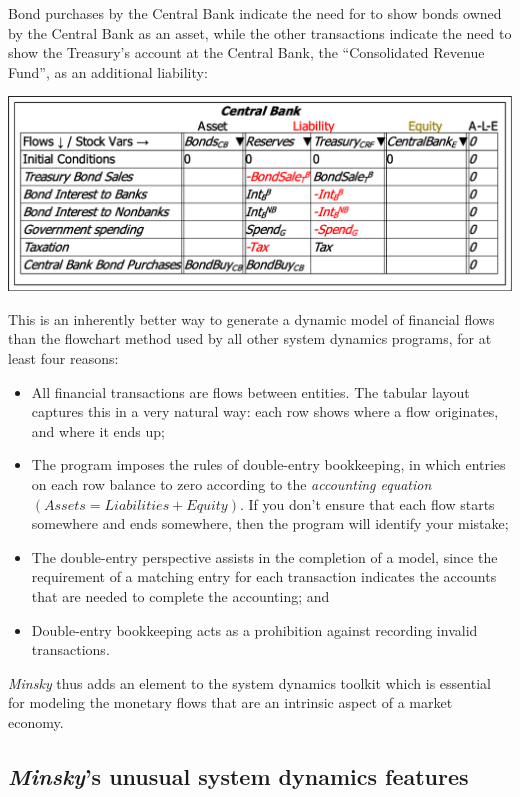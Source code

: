 Bond purchases by the Central Bank indicate the need for to show bonds
owned by the Central Bank as an asset, while the other transactions
indicate the need to show the Treasury's account at the Central Bank,
the ``Consolidated Revenue Fund'', as an additional liability:

\noindent\includegraphics[width=\textwidth]{images/GodleyTableSecondComplete}

This is an inherently better way to generate a dynamic model of financial
flows than the flowchart method used by all other system dynamics
programs, for at least four reasons: 
\begin{itemize}
\item All financial transactions are flows between entities. The tabular
layout captures this in a very natural way: each row shows where a
flow originates, and where it ends up;
\item The program imposes the rules of double-entry bookkeeping, in which
entries on each row balance to zero according to the {\em accounting
equation} $(Assets=Liabilities+Equity)$. If you don't ensure that
each flow starts somewhere and ends somewhere, then the program will
identify your mistake;
\item The double-entry perspective assists in the completion of a model,
since the requirement of a matching entry for each transaction indicates
the accounts that are needed to complete the accounting; and
\item Double-entry bookkeeping acts as a prohibition against recording invalid
transactions.
\end{itemize}
\emph{Minsky} thus adds an element to the system dynamics toolkit
which is essential for modeling the monetary flows that are an intrinsic
aspect of a market economy.

\subsection{\emph{Minsky}'s unusual system dynamics features}

